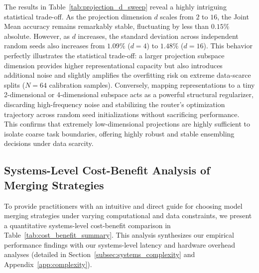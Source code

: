The results in Table~\ref{tab:projection_d_sweep} reveal a highly intriguing statistical trade-off. As the projection dimension $d$ scales from $2$ to $16$, the Joint Mean accuracy remains remarkably stable, fluctuating by less than $0.15\%$ absolute. However, as $d$ increases, the standard deviation across independent random seeds also increases from $1.09\%$ ($d=4$) to $1.48\%$ ($d=16$). This behavior perfectly illustrates the statistical trade-off: a larger projection subspace dimension provides higher representational capacity but also introduces additional noise and slightly amplifies the overfitting risk on extreme data-scarce splits ($N=64$ calibration samples). Conversely, mapping representations to a tiny 2-dimensional or 4-dimensional subspace acts as a powerful structural regularizer, discarding high-frequency noise and stabilizing the router's optimization trajectory across random seed initializations without sacrificing performance. This confirms that extremely low-dimensional projections are highly sufficient to isolate coarse task boundaries, offering highly robust and stable ensembling decisions under data scarcity.

\subsection{Systems-Level Cost-Benefit Analysis of Merging Strategies}
\label{subsec:cost_benefit}
To provide practitioners with an intuitive and direct guide for choosing model merging strategies under varying computational and data constraints, we present a quantitative systems-level cost-benefit comparison in Table~\ref{tab:cost_benefit_summary}. This analysis synthesizes our empirical performance findings with our systems-level latency and hardware overhead analyses (detailed in Section~\ref{subsec:systems_complexity} and Appendix~\ref{app:complexity}).

